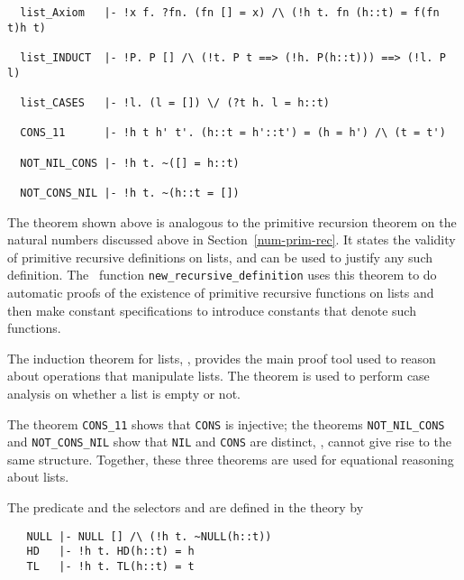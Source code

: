\begin{hol}
{\small
\begin{verbatim}
  list_Axiom   |- !x f. ?fn. (fn [] = x) /\ (!h t. fn (h::t) = f(fn t)h t)

  list_INDUCT  |- !P. P [] /\ (!t. P t ==> (!h. P(h::t))) ==> (!l. P l)

  list_CASES   |- !l. (l = []) \/ (?t h. l = h::t)

  CONS_11      |- !h t h' t'. (h::t = h'::t') = (h = h') /\ (t = t')

  NOT_NIL_CONS |- !h t. ~([] = h::t)

  NOT_CONS_NIL |- !h t. ~(h::t = [])
\end{verbatim}}
\end{hol}

The theorem  shown above is analogous to the primitive
recursion theorem on the
natural numbers discussed above in Section~\ref{num-prim-rec}.  It
states the validity of primitive recursive definitions on lists, and
can be used to justify any such definition.  The \ML\ function
{\small\verb+new_recursive_definition+} uses this theorem to do
automatic  proofs of the existence
of primitive recursive functions on lists and then make constant
specifications to introduce constants that denote such functions.

The induction theorem for lists, , provides the main
proof tool used to reason about operations that manipulate lists. The
theorem  is used to perform case analysis on whether a
list is empty or not.

The theorem {\small\verb+CONS_11+} shows that {\small\verb+CONS+} is injective;
the theorems {\small\verb+NOT_NIL_CONS+} and {\small\verb+NOT_CONS_NIL+} show that
{\small\verb+NIL+} and {\small\verb+CONS+} are distinct, \ie,
cannot give rise to the same structure. Together, these three theorems
are used for equational reasoning about lists.

The predicate  and the selectors  and  are
defined
in the theory  by
%
\begin{hol}
{\small
\begin{verbatim}
   NULL |- NULL [] /\ (!h t. ~NULL(h::t))
   HD   |- !h t. HD(h::t) = h
   TL   |- !h t. TL(h::t) = t
\end{verbatim}}
\end{hol}

